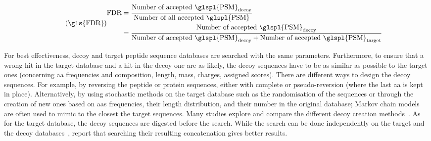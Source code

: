 \begin{equation}\label{eq:fdr-prot}
    \tag{\gls{FDR}}
    \begin{split}
        {\text{FDR}} & =\frac{\text{Number of accepted \glspl{PSM}}_{\text{decoy}}}%
    {\text{Number of all accepted \glspl{PSM}}}\\
          & =\frac{\text{Number of accepted \glspl{PSM}}_{\text{decoy}}}%
    {\text{Number of accepted \glspl{PSM}}_{\text{decoy}}+\text{Number of accepted \glspl{PSM}}_{\text{target}}}
\end{split}
\raisetag{4\normalbaselineskip}
\end{equation}
\begin{comment}
\vspace{-6mm}
where:
{\small
\begin{itemize}[topsep=0pt,nosep]
    \item $\text{\emph{Number of accepted \glspl{PSM}}}_{\text{decoy}}$
is the number of \glspl{PSM} from decoy sequences
that are above a specified threshold $\mathcal{t}$,
    \item $\text{\emph{Number of all accepted \glspl{PSM}}}$
is the total number of accepted \glspl{PSM}
above the specified threshold $\mathcal{t}$,
including the accepted decoy \glspl{PSM}.
    \item $\text{\emph{Number of accepted \glspl{PSM}}}_{\text{target}}$
is the number of accepted \glspl{PSM} above the specified threshold $\mathcal{t}$.
\end{itemize}
}
\end{comment}

\vspace{-4mm}
For best effectiveness,
decoy and target peptide sequence databases are searched with the same parameters.
Furthermore, to ensure that
a wrong hit in the target database and a hit in the decoy one are as likely,
the decoy sequences have to be as similar as possible to the target ones
(concerning \gls{aa} frequencies and composition,
length, mass, charges, assigned scores).
There are different ways to design the decoy sequences.
For example, by reversing the peptide or protein sequences,
either with complete or pseudo-reversion (where the last \gls{aa} is kept in place).
Alternatively, by using stochastic methods on the target database
such as the randomisation of the sequences or
through the creation of new ones based on \glspl{aa} frequencies,
their length distribution,
and their number in the original database;
Markov chain models~ are often used to mimic to the closest
the target sequences.
Many studies explore and compare the different decoy creation
methods~.
As for the target database,
the decoy sequences are digested  before the search.
While the search can be done independently
on the target and the decoy databases~,
\citet*{Elias2007-wi} report that
searching their resulting concatenation gives better results.

